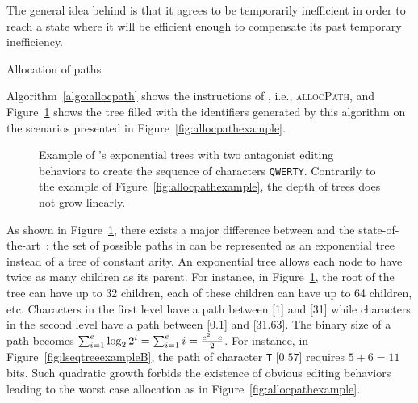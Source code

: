 \noindent The general idea behind \LSEQ is that it agrees to be temporarily
inefficient in order to reach a state where it will be efficient enough to
compensate its past temporary inefficiency.


\begin{algorithm}

\caption{\label{algo:allocpath}Allocation of paths}
\end{algorithm}

Algorithm~\ref{algo:allocpath} shows the instructions of \LSEQ, i.e.,
\textsc{allocPath}, and Figure~\ref{fig:lseqtreeexample} shows the tree filled
with the identifiers generated by this algorithm on the scenarios presented in
Figure~\ref{fig:allocpathexample}.

\begin{figure}
  \centering
  \caption{\label{fig:lseqtreeexample} Example of \LSEQ's exponential trees with
    two antagonist editing behaviors to create the sequence of characters
    \texttt{QWERTY}. Contrarily to the example of
    Figure~\ref{fig:allocpathexample}, the depth of trees does not grow
    linearly.}
\end{figure}

As shown in Figure~\ref{fig:lseqtreeexample}, there exists a major difference
between \LSEQ and the state-of-the-art~\cite{preguica2009commutative,
  weiss2009logoot}: the set of possible paths in \LSEQ can be represented as an
exponential tree~\cite{andersson1996faster,andersson2007dynamic} instead of a
tree of constant arity. An exponential tree allows each node to have twice as
many children as its parent. For instance, in Figure~\ref{fig:lseqtreeexample},
the root of the tree can have up to 32 children, each of these children can have
up to 64 children, etc.
Characters in the first level have a path between [1] and [31] while characters
in the second level have a path between [0.1] and [31.63]. \noindent The binary
size of a path becomes
$\textstyle\sum\nolimits_{i=1}^{e}\log_2{2^i}=\sum\nolimits_{i=1}^{e}i=
{e^2-e\over{2}}$.
For instance, in Figure~\ref{fig:lseqtreeexampleB}, the path of character
\texttt{T} [$0.57$] requires $5 + 6 = 11$ bits.  Such quadratic growth forbids
the existence of obvious editing behaviors leading to the worst case allocation
as in Figure~\ref{fig:allocpathexample}.


